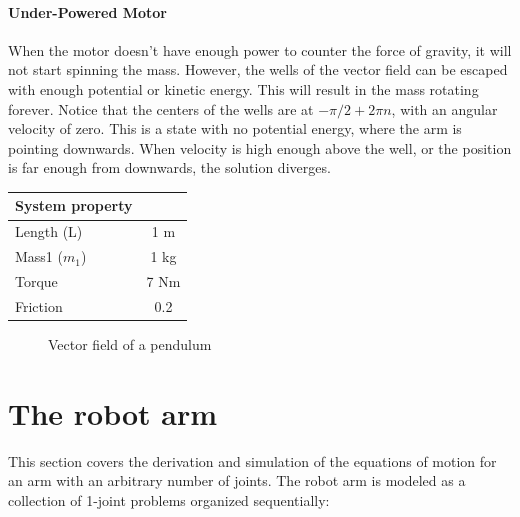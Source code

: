 \documentclass{article}
\begin{document}
\paragraph{Under-Powered Motor} 
When the motor doesn't have enough power to counter the force of gravity, it will not start spinning the mass. However, the wells of the vector field can be escaped with enough potential or kinetic energy. This will result in the mass rotating forever. Notice that the centers of the wells are at $-\pi/2 + 2\pi n$, with an angular velocity of zero. This is a state with no potential energy, where the arm is pointing downwards. When velocity is high enough above the well, or the position is far enough from downwards, the solution diverges. 
\begin{table}[h]
\centering
\begin{tabular}{|l|c|}
\hline
System property & \\
\hline
Length (L) & 1 m \\
Mass1 ($m_1$) & 1 kg \\
Torque & 7 Nm \\
Friction & 0.2 \\
\hline
\end{tabular}
\label{tab:quantities}
\end{table}
\begin{figure}[!h]
  \caption{Vector field of a pendulum}
  \label{fig:key}
\end{figure}


\section{The robot arm}
\centering This section covers the derivation and simulation of the equations of motion for an arm with an arbitrary number of joints. The robot arm is modeled as a collection of 1-joint problems organized sequentially:
\end{document}
